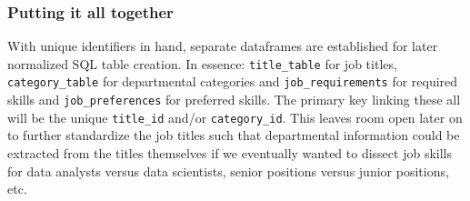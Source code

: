 \documentclass[]{article}
\newenvironment{Shaded}{\begin{snugshade}}{\end{snugshade}}
\newcommand{\DataTypeTok}[1]{\textcolor[rgb]{0.13,0.29,0.53}{#1}}
\newcommand{\KeywordTok}[1]{\textcolor[rgb]{0.13,0.29,0.53}{\textbf{#1}}}
\newcommand{\NormalTok}[1]{#1}
\newcommand{\OperatorTok}[1]{\textcolor[rgb]{0.81,0.36,0.00}{\textbf{#1}}}
\newcommand{\OtherTok}[1]{\textcolor[rgb]{0.56,0.35,0.01}{#1}}
\newcommand{\StringTok}[1]{\textcolor[rgb]{0.31,0.60,0.02}{#1}}
\begin{document}
\begin{Shaded}
\end{Shaded}

\hypertarget{putting-it-all-together}{%
\subsubsection{Putting it all together}\label{putting-it-all-together}}

With unique identifiers in hand, separate dataframes are established for
later normalized SQL table creation. In essence: \texttt{title\_table}
for job titles, \texttt{category\_table} for departmental categories and
\texttt{job\_requirements} for required skills and
\texttt{job\_preferences} for preferred skills. The primary key linking
these all will be the unique \texttt{title\_id} and/or
\texttt{category\_id}. This leaves room open later on to further
standardize the job titles such that departmental information could be
extracted from the titles themselves if we eventually wanted to dissect
job skills for data analysts versus data scientists, senior positions
versus junior positions, etc.
\end{document}
